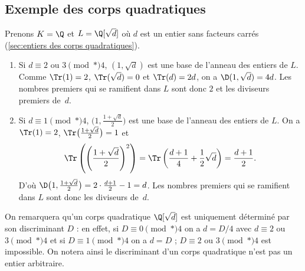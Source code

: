 \documentclass[11pt, useosf,
  title in boldface,
  theorem in new line,
  theorem numbering = section,
  number theorems separately,
]{simplivre}
\begin{document}
\smallskip
    \subsection*{Exemple des corps quadratiques}
        Prenons \( K = \Q \) et \( L = \Q[\sqrt{d}] \) où \( d \) est un entier sans facteurs carrés (\cref{sec:entiers des corps quadratiques}).
        \begin{enumerate}
            \item Si \( d \equiv 2 \) ou \( 3 \pmod*{4} \), \( (1, \sqrt{d}) \) est une base de l'anneau des entiers de \( L \). Comme \( \Tr(1) = 2 \), \( \Tr(\sqrt{d}) = 0 \) et \( \Tr(d) = 2d \), on a \( \D(1, \sqrt{d}) = 4d \). Les nombres premiers qui se ramifient dans \( L \) sont donc \( 2 \) et les diviseurs premiers de~\( d \).
            \item Si \( d \equiv 1 \pmod*{4} \), \( \bigl(1, \frac{1+\sqrt{d}}{2}\bigr) \) est une base de l'anneau des entiers de \( L \). On a \( \Tr(1) = 2 \), \( \Tr\bigl(\frac{1+\sqrt{d}}{2}\bigr) = 1 \) et
            \[
                \Tr\left(\left(\frac{1+\sqrt{d}}{2}\right)^2\right) = \Tr\left(\frac{d+1}{4}+\frac{1}{2}\sqrt{d}\right) = \frac{d+1}{2}.
            \]
            D'où \( \D\bigl(1, \frac{1+\sqrt{d}}{2}\bigr) = 2 \cdot \frac{d+1}{2} - 1 = d \). Les nombres premiers qui se ramifient dans \( L \) sont donc les diviseurs de~\( d \).
        \end{enumerate}

        On remarquera qu'un corps quadratique \( \Q[\sqrt{d}] \) est uniquement déterminé par son discriminant \( D \) : en effet, si \( D \equiv 0 \pmod*{4} \) on a \( d = D/4 \) avec \( d \equiv 2 \) ou \( 3 \pmod*{4} \) et si \( D \equiv 1 \pmod*{4} \) on a \( d = D \) ; \( D \equiv 2 \) ou \( 3 \pmod*{4} \) est impossible. On notera ainsi le discriminant d'un corps quadratique n'est pas un entier arbitraire.
\end{document}
